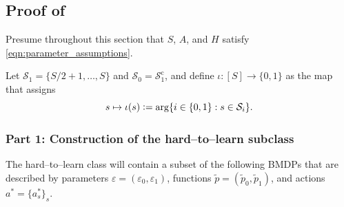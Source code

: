 \documentclass[11pt]{article}
\newcommand{\eqdef}{\vcentcolon=}
\newcommand{\mcS}{\mathcal{S}}
\theoremstyle{definition}
\theoremstyle{definition}
\begin{document}
\subsection{Proof of \texorpdfstring{}{the regret lower bound}}
\label{sec:proof_of_regret_lower_bound}

Presume throughout this section that $S$, $A$, and $H$ satisfy \eqref{eqn:parameter_assumptions}.

Let $\mcS_1 = \{ S/2+1,\ldots,S \}$ and $\mcS_0 = \mcS_1^{\mathrm{c}}$, and define $\iota : [S] \rightarrow \{0,1\}$ as the map that assigns
\begin{equation}
	s
	\mapsto
	\iota(s)
	\eqdef
	\arg
	\{
	i \in \{ 0, 1 \}
	:
	s \in \mathcal{S}_i
	\}
	.
	\label{def:iota}
\end{equation}

\subsubsection*{Part 1: Construction of the hard--to--learn subclass}

The hard--to--learn class will contain a subset of the following \glspl{BMDP} that are described by parameters $\varepsilon = (\varepsilon_0, \varepsilon_1)$, functions $\tilde{p} = (\tilde{p}_0, \tilde{p}_1)$, and actions $a^* = \{a_s^*\}_{s}$.
\end{document}
